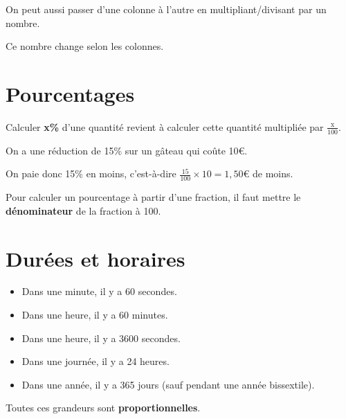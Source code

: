 \documentclass[../€Cours-complet/Cours-complet]{subfiles}
\begin{document}
\begin{greybox}[frametitle={Remarque}]
	On peut aussi passer d'une colonne à l'autre en multipliant/divisant par un nombre.

	Ce nombre change selon les colonnes.
\end{greybox}

\section{Pourcentages}

\begin{cours}
	Calculer \textbf{x\%} d'une quantité revient à calculer cette quantité multipliée par $\frac{\text{x}}{100}$.
\end{cours}

\begin{exemple}
	On a une réduction de 15\% sur un gâteau qui coûte 10€.

	On paie donc 15\% en moins, c'est-à-dire $\frac{15}{100} × 10 = 1,50€$ de moins.
\end{exemple}

\begin{cours}
	Pour calculer un pourcentage à partir d'une fraction, il faut mettre le \textbf{dénominateur} de la fraction à 100.
\end{cours}

\section{Durées et horaires}

\begin{cours}[Durées]
	\begin{itemize}
		\item Dans une minute, il y a 60 secondes.
		\item Dans une heure, il y a 60 minutes.
		\item Dans une heure, il y a 3600 secondes.
		\item Dans une journée, il y a 24 heures.
		\item Dans une année, il y a 365 jours (sauf pendant une année bissextile).
	\end{itemize} \vspace{1em}

	Toutes ces grandeurs sont \textbf{proportionnelles}.
\end{cours}
\end{document}
